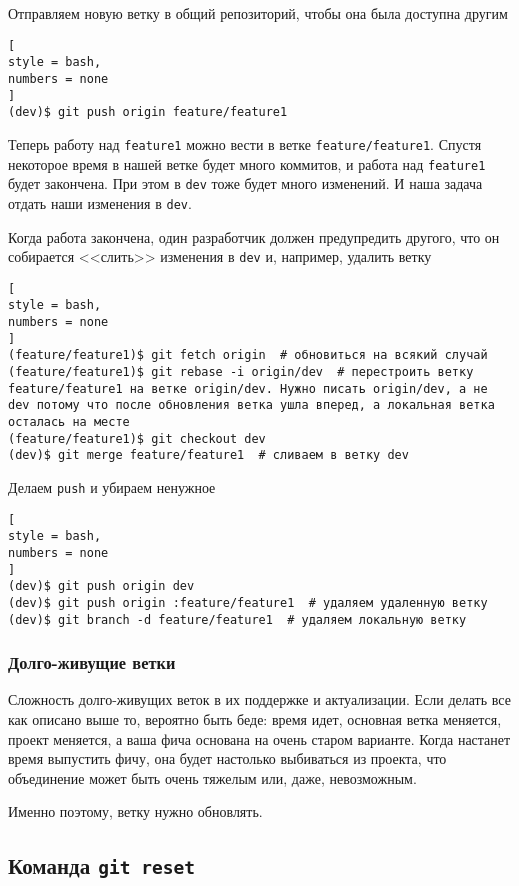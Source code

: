 \documentclass[%
	11pt,
	a4paper,
	utf8,
		]{article}
\begin{document}
Отправляем новую ветку в общий репозиторий, чтобы она была доступна другим
\begin{lstlisting}[
style = bash,
numbers = none
]
(dev)$ git push origin feature/feature1
\end{lstlisting}

Теперь работу над \texttt{feature1} можно вести в ветке \texttt{feature/feature1}. Спустя некоторое время в нашей ветке будет много коммитов, и работа над \texttt{feature1} будет закончена. При этом в \texttt{dev} тоже будет много изменений. И наша задача отдать наши изменения в \texttt{dev}.

Когда работа закончена, один разработчик должен предупредить другого, что он собирается <<слить>> изменения в \texttt{dev} и, например, удалить ветку
\begin{lstlisting}[
style = bash,
numbers = none
]
(feature/feature1)$ git fetch origin  # обновиться на всякий случай
(feature/feature1)$ git rebase -i origin/dev  # перестроить ветку feature/feature1 на ветке origin/dev. Нужно писать origin/dev, а не dev потому что после обновления ветка ушла вперед, а локальная ветка осталась на месте
(feature/feature1)$ git checkout dev
(dev)$ git merge feature/feature1  # сливаем в ветку dev
\end{lstlisting}

Делаем \texttt{push} и убираем ненужное
\begin{lstlisting}[
style = bash,
numbers = none
]
(dev)$ git push origin dev
(dev)$ git push origin :feature/feature1  # удаляем удаленную ветку
(dev)$ git branch -d feature/feature1  # удаляем локальную ветку
\end{lstlisting}

\subsubsection{Долго-живущие ветки}

Сложность долго-живущих веток в их поддержке и актуализации. Если делать все как описано выше то, вероятно быть беде: время идет, основная ветка меняется, проект меняется, а ваша фича основана на очень старом варианте. Когда настанет время выпустить фичу, она будет настолько выбиваться из проекта, что объединение может быть очень тяжелым или, даже, невозможным.

Именно поэтому, ветку нужно обновлять.


\subsection{Команда \texttt{git reset}}
\end{document}
